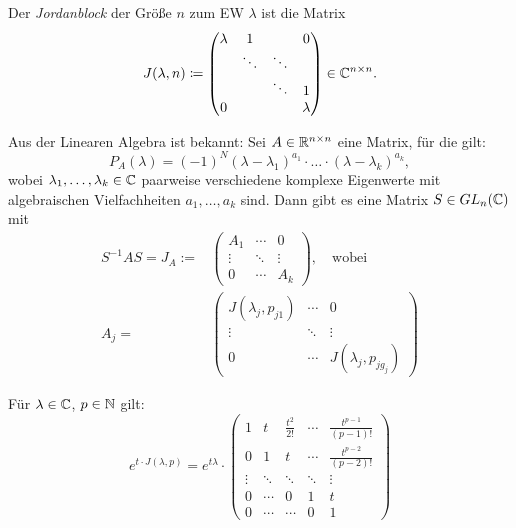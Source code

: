 \documentclass{cheat-sheet}
\begin{document}


\begin{defn}
  Der \emph{Jordanblock} der Größe $n$ zum EW $\lambda$ ist die Matrix
  \[ J(\lambda, n) \coloneqq \begin{pmatrix}
    \lambda & 1 & & 0 \\
    & \ddots & \ddots & \\
    & & \ddots & 1 \\
    0 & & & \lambda
  \end{pmatrix} \in \mathbb{C}^{n \times n}. \]
\end{defn}

\begin{bem}
  Aus der Linearen Algebra ist bekannt: Sei $A \in \mathbb{R}^{n \times n}$ eine Matrix, für die gilt:
  \[ P_A(\lambda) = (-1)^N (\lambda - \lambda_1)^{a_1} \cdot \ldots \cdot (\lambda - \lambda_k)^{a_k}, \]
  wobei $\lambda_1, \ldots, \lambda_k \in \mathbb{C}$ paarweise verschiedene komplexe Eigenwerte mit algebraischen Vielfachheiten $a_1, \ldots, a_k$ sind. Dann gibt es eine Matrix $S \in GL_n(\mathbb{C})$ mit
  \begin{align*}
    S^{-1} A S = J_A :=& \begin{pmatrix}
      A_1 & \cdots & 0\\
      \vdots & \ddots & \vdots\\
      0 & \cdots & A_k
    \end{pmatrix},
    \quad \text{wobei}\\
    A_j =& \begin{pmatrix}
      J(\lambda_j, p_{j1}) & \cdots & 0\\
      \vdots & \ddots & \vdots\\
      0 & \cdots & J(\lambda_j, p_{j g_j})
    \end{pmatrix}
  \end{align*}
\end{bem}

\begin{prop}
  Für $\lambda \in \mathbb{C}$, $p \in \mathbb{N}$ gilt:
  \[
    e^{t \cdot J(\lambda, p)} = e^{t \lambda} \cdot \begin{pmatrix}
      1 & t & \tfrac{t^2}{2!} & \cdots & \tfrac{t^{p-1}}{(p-1)!} \\
      0 & 1 & t & \cdots & \tfrac{t^{p-2}}{(p-2)!} \\
      \vdots & \ddots & \ddots & \ddots & \vdots \\
      0 & \cdots & 0 & 1 & t \\
      0 & \cdots & \cdots & 0 & 1
    \end{pmatrix}
  \]
\end{prop}
\end{document}
